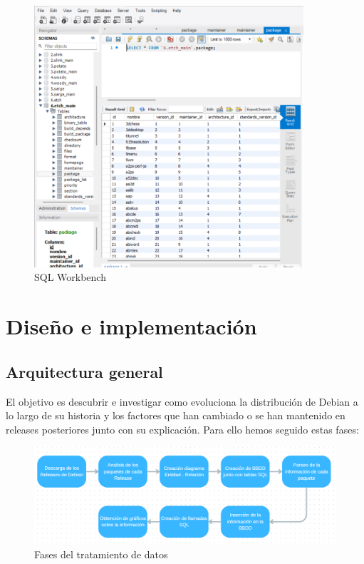 \documentclass[a4paper, 12pt]{book}
\begin{document}
\begin{figure}[hb]
	\centering
	\includegraphics[width=10cm, keepaspectratio]{img/workbench.png}
	\caption{SQL Workbench}
	\label{fig:workbench}
\end{figure}

\cleardoublepage
\chapter{Diseño e implementación}
\label{sec:diseno}

\section{Arquitectura general} 
\label{sec:arquitectura}
El objetivo es descubrir e investigar como evoluciona la distribución de Debian a lo largo de su historia y los factores que han cambiado o se han mantenido en releases posteriores junto con su explicación. Para ello hemos seguido estas fases:
\begin{figure}[h]
	\centering
	\includegraphics[width=14cm, keepaspectratio]{img/Diagrama_general.png}
	\caption{Fases del tratamiento de datos}
	\label{fig:Diagrama_general}
\end{figure}
\end{document}
